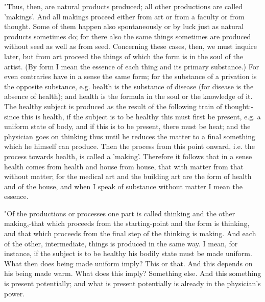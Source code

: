 "Thus, then, are natural products produced; all other productions
are called 'makings'. And all makings proceed either from art or from
a faculty or from thought. Some of them happen also spontaneously
or by luck just as natural products sometimes do; for there also the
same things sometimes are produced without seed as well as from seed.
Concerning these cases, then, we must inquire later, but from art
proceed the things of which the form is in the soul of the artist.
(By form I mean the essence of each thing and its primary substance.)
For even contraries have in a sense the same form; for the substance
of a privation is the opposite substance, e.g. health is the substance
of disease (for disease is the absence of health); and health is the
formula in the soul or the knowledge of it. The healthy subject is
produced as the result of the following train of thought:-since this
is health, if the subject is to be healthy this must first be present,
e.g. a uniform state of body, and if this is to be present, there
must be heat; and the physician goes on thinking thus until he reduces
the matter to a final something which he himself can produce. Then
the process from this point onward, i.e. the process towards health,
is called a 'making'. Therefore it follows that in a sense health
comes from health and house from house, that with matter from that
without matter; for the medical art and the building art are the form
of health and of the house, and when I speak of substance without
matter I mean the essence. 

"Of the productions or processes one part is called thinking and the
other making,-that which proceeds from the starting-point and the
form is thinking, and that which proceeds from the final step of the
thinking is making. And each of the other, intermediate, things is
produced in the same way. I mean, for instance, if the subject is
to be healthy his bodily state must be made uniform. What then does
being made uniform imply? This or that. And this depends on his being
made warm. What does this imply? Something else. And this something
is present potentially; and what is present potentially is already
in the physician's power. 

